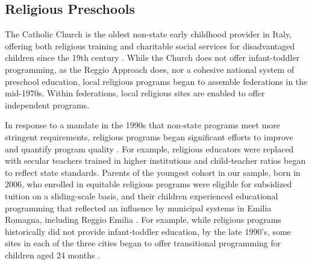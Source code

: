 \subsection{Religious Preschools}

The Catholic Church is the oldest non-state early childhood provider in Italy, offering both religious training and charitable social services for disadvantaged children since the 19th century \citep{OECD_2001_Italy-Country-Note}. While the Church does not offer infant-toddler programming, as the Reggio Approach does, nor a cohesive national system of preschool education, local religious programs began to assemble federations in the mid-1970s. Within federations, local religious sites are enabled to offer independent programs. 


In response to a mandate in the 1990s that non-state programs meet more stringent requirements, religious programs began significant efforts to improve and quantify program quality \citep{Malizia-Cicatelli_2011_BOOK_Catholic-School}. For example, religious educators were replaced with secular teachers trained in higher institutions and child-teacher ratios began to reflect state standards. Parents of the youngest cohort in our sample, born in 2006, who enrolled in equitable religious programs were eligible for subsidized tuition on a sliding-scale basis, and their children experienced educational programming that reflected an influence by municipal systems in Emilia Romagna, including Reggio Emilia \citep{Hohnerlein_2009_Paradox-Public-Preschools,OECD_2001_Italy-Country-Note}. For example, while religious programs historically did not provide infant-toddler education, by the late 1990's, some sites in each of the three cities began to offer transitional programming for children aged 24 months \citep{Malizia-Cicatelli_2011_BOOK_Catholic-School,CEHD_2016_Historical-Analysis}. 

